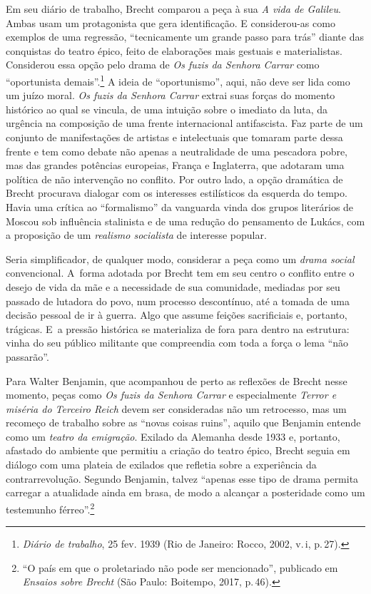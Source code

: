 Em seu diário de trabalho, Brecht comparou a peça à sua {\it A vida de
Galileu}. Ambas usam um protagonista que gera identificação. E
considerou-as como exemplos de uma regressão, “tecnicamente um grande
passo para trás” diante das conquistas do teatro épico, feito de
elaborações mais gestuais e materialistas. Considerou essa opção pelo
drama de {\it Os fuzis da Senhora Carrar} como “oportunista
demais”.\footnote{{\it Diário de trabalho}, 25 fev. 1939 (Rio de Janeiro:
  Rocco, 2002, v.\,{\sc i}, p.\,27).} A ideia de “oportunismo”, aqui, não deve
ser lida como um juízo moral. {\it Os fuzis da Senhora Carrar} extrai
suas forças do momento histórico ao qual se vincula, de uma intuição
sobre o imediato da luta, da urgência na composição de uma frente
internacional antifascista. Faz parte de um conjunto de manifestações de
artistas e intelectuais que tomaram parte dessa frente e tem como debate
não apenas a neutralidade de uma pescadora pobre, mas das grandes
potências europeias, França e Inglaterra, que adotaram uma política de
não intervenção no conflito. Por outro lado, a opção dramática de Brecht
procurava dialogar com os interesses estilísticos da esquerda do tempo.
Havia uma crítica ao “formalismo” da vanguarda vinda dos grupos
literários de Moscou sob influência stalinista e de uma redução do
pensamento de Lukács, com a proposição de um {\it realismo socialista}
de interesse popular.

Seria simplificador, de qualquer modo, considerar a peça como um
{\it drama social} convencional. A~forma adotada por Brecht tem em seu centro 
o conflito entre o desejo de vida da mãe e a necessidade de sua
comunidade, mediadas por seu passado de lutadora do povo, num processo
descontínuo, até a tomada de uma decisão pessoal de ir à guerra. Algo
que assume feições sacrificiais e, portanto, trágicas. E~a pressão
histórica se materializa de fora para dentro na estrutura: vinha do seu
público militante que compreendia com toda a força o lema “não
passarão”.

Para Walter Benjamin, que acompanhou de perto as reflexões de Brecht
nesse momento, peças como {\it Os fuzis da Senhora Carrar} e
especialmente {\it Terror e miséria do Terceiro Reich} devem ser
consideradas não um retrocesso, mas um recomeço de trabalho sobre as
“novas coisas ruins”, aquilo que Benjamin entende como um {\it teatro da
emigração}. Exilado da Alemanha desde 1933 e, portanto, afastado do
ambiente que permitiu a criação do teatro épico, Brecht seguia em
diálogo com uma plateia de exilados que refletia sobre a experiência da
contrarrevolução. Segundo Benjamin, talvez “apenas esse tipo de drama
permita carregar a atualidade ainda em brasa, de modo a alcançar a
posteridade como um testemunho férreo”.\footnote{“O país em que o
  proletariado não pode ser mencionado”, publicado em {\it Ensaios sobre
  Brecht} (São Paulo: Boitempo, 2017, p.\,46).}

